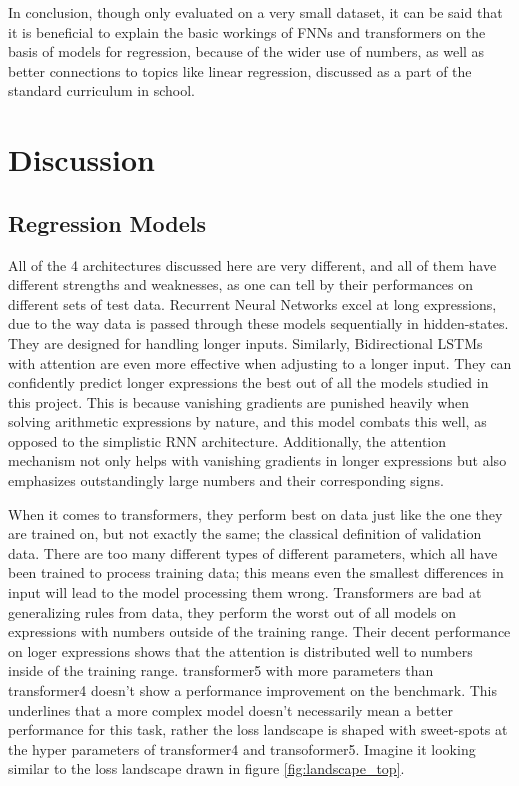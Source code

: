 \documentclass{article}
\begin{document}
In conclusion, though only evaluated on a very small dataset, it can be said that it is beneficial to explain the basic workings of FNNs and transformers on the basis of models for regression, because of the wider use of numbers, as well as better connections to topics like linear regression, discussed as a part of the standard curriculum in school.

\section{Discussion}
\subsection{Regression Models}
All of the 4 architectures discussed here are very different, and all of them have different strengths and weaknesses, as one can tell by their performances on different sets of test data. Recurrent Neural Networks excel at long expressions, due to the way data is passed through these models sequentially in hidden-states. They are designed for handling longer inputs. Similarly, Bidirectional LSTMs with attention are even more effective when adjusting to a longer input. They can confidently predict longer expressions the best out of all the models studied in this project. This is because vanishing gradients are punished heavily when solving arithmetic expressions by nature, and this model combats this well, as opposed to the simplistic RNN architecture. Additionally, the attention mechanism not only helps with vanishing gradients in longer expressions but also emphasizes outstandingly large numbers and their corresponding signs. 

When it comes to transformers, they perform best on data just like the one they are trained on, but not exactly the same; the classical definition of validation data. There are too many different types of different parameters, which all have been trained to process training data; this means even the smallest differences in input will lead to the model processing them wrong. Transformers are bad at generalizing rules from data, they perform the worst out of all models on expressions with numbers outside of the training range. Their decent performance on loger expressions shows that the attention is distributed well to numbers inside of the training range. transformer5 with more parameters than transformer4 doesn't show a performance improvement on the benchmark. This underlines that a more complex model doesn't necessarily mean a better performance for this task, rather the loss landscape is shaped with sweet-spots at the hyper parameters of transformer4 and transoformer5. Imagine it looking similar to the loss landscape drawn in figure \ref{fig:landscape_top}.
\end{document}

